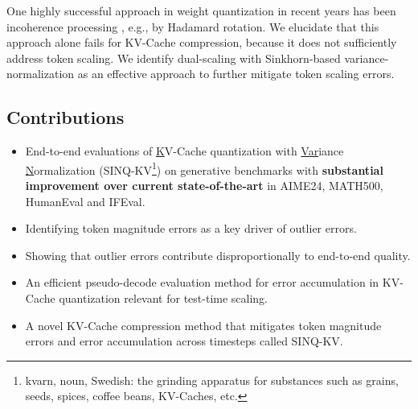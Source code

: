 \documentclass{llmxive}
\providecommand{\methodname}{SINQ-KV\xspace}
\begin{document}
One highly successful approach in weight quantization in recent years has been incoherence processing \cite{chee2023quip}, e.g., by Hadamard rotation. We elucidate that this approach alone fails for KV-Cache compression, because it does not sufficiently address token scaling. We identify dual-scaling with Sinkhorn-based variance-normalization as an effective approach to further mitigate token scaling errors. 

\subsection{Contributions}

\begin{itemize}
    \item End-to-end evaluations of \underline{K}V-Cache quantization with \underline{Var}iance \underline{N}ormalization (\methodname \footnote{kvarn, noun, Swedish: the grinding apparatus for substances such as grains, seeds, spices, coffee beans, KV-Caches, etc.}) on generative benchmarks with \textbf{substantial improvement over current state-of-the-art} in AIME24, MATH500, HumanEval and IFEval.
    \item Identifying token magnitude errors as a key driver of outlier errors.
    \item Showing that outlier errors contribute disproportionally to end-to-end quality.
    \item An efficient pseudo-decode evaluation method for error accumulation in KV-Cache quantization relevant for test-time scaling.
    \item A novel KV-Cache compression method that mitigates token magnitude errors and error accumulation across timesteps called \methodname.%
    
\end{itemize}
\end{document}
